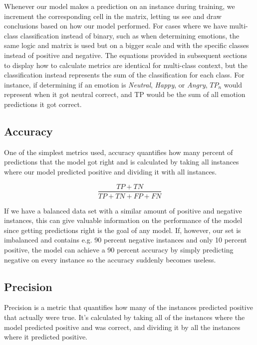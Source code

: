 \documentclass[nofilelist]{cslthse-msc}
\begin{document}
Whenever our model makes a prediction on an instance during training, we increment the corresponding cell in the matrix, letting us see and draw conclusions based on how our model performed. 
For cases where we have multi-class classification instead of binary, such as when determining emotions, the same logic and matrix is used but on a bigger scale and with the specific classes instead of positive and negative. The equations provided in subsequent sections to display how to calculate metrics are identical for multi-class context, but the classification instead represents the sum of the classification for each class. For instance, if determining if an emotion is \textit{Neutral}, \textit{Happy}, or \textit{Angry}, $TP_{n}$ would represent when it got neutral correct, and TP would be the sum of all emotion predictions it got correct.  









\subsection{Accuracy}
One of the simplest metrics used, accuracy quantifies how many percent of predictions that the model got right and is calculated by taking all instances where our model predicted positive and dividing it with all instances.

$$\frac{TP + TN}{TP + TN + FP + FN}$$

If we have a balanced data set with a similar amount of positive and negative instances, this can give valuable information on the performance of the model since getting predictions right is the goal of any model. If, however, our set is imbalanced and contains e.g. 90 percent negative instances and only 10 percent positive, the model can achieve a 90 percent accuracy by simply predicting negative on every instance so the accuracy suddenly becomes useless.

\subsection{Precision}
Precision is a metric that quantifies how many of the instances predicted positive that actually were true. It's calculated by taking all of the instances where the model predicted positive and was correct, and dividing it by all the instances where it predicted positive.
\end{document}
